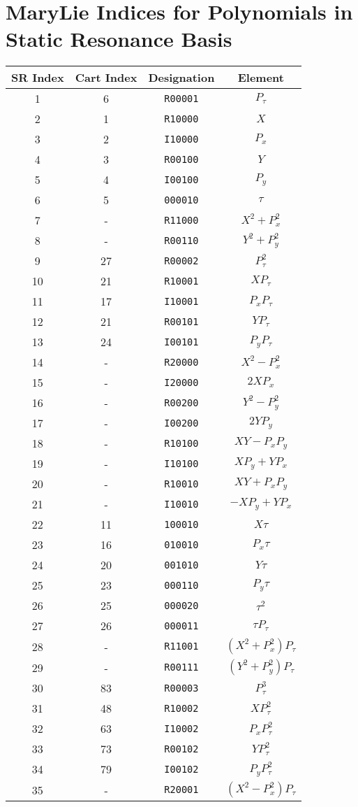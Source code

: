 {\clearpage
\section{MaryLie Indices for Polynomials in Static Resonance Basis}
{\rm
\begin{center}
\begin{tabular}{cccc}
SR Index&Cart Index&Designation&Element\\ \hline
    1&6&{\tt R00001}&$P_\tau$\\
    2&1&{\tt R10000}&$X$\\
    3&2&{\tt I10000}&$P_x$\\
    4&3&{\tt R00100}&$Y$\\
    5&4&{\tt I00100}&$P_y$\\
    6&5&{\tt 000010}&$\tau$\\
    7&-&{\tt R11000}&$X^2+P_x^2$\\
    8&-&{\tt R00110}&$Y^2+P_y^2$\\
    9&27&{\tt R00002}&$P_{\tau}^2$\\
   10&21&{\tt R10001}&$XP_{\tau}$\\
   11&17&{\tt I10001}&$P_xP_{\tau}$\\
   12&21&{\tt R00101}&$YP_{\tau}$\\
   13&24&{\tt I00101}&$P_yP_{\tau}$\\
   14&-&{\tt R20000}&$X^2-P_x^2$\\
   15&-&{\tt I20000}&$2XP_x$\\
   16&-&{\tt R00200}&$Y^2-P_y^2$\\
   17&-&{\tt I00200}&$2YP_y$\\
   18&-&{\tt R10100}&$XY-P_xP_y$\\
   19&-&{\tt I10100}&$XP_y+YP_x$\\
   20&-&{\tt R10010}&$XY+P_xP_y$\\
   21&-&{\tt I10010}&$-XP_y+YP_x$\\
   22&11&{\tt 100010}&$X{\tau}$\\
   23&16&{\tt 010010}&$P_x{\tau}$\\
   24&20&{\tt 001010}&$Y{\tau}$\\
   25&23&{\tt 000110}&$P_y{\tau}$\\
   26&25&{\tt 000020}&${\tau}^2$\\
   27&26&{\tt 000011}&${\tau}P_{\tau}$\\
   28&-&{\tt R11001}&$(X^2+P_x^2)P_{\tau}$\\
   29&-&{\tt R00111}&$(Y^2+P_y^2)P_{\tau}$\\
   30&83&{\tt R00003}&$P_{\tau}^3$\\
   31&48&{\tt R10002}&$XP_{\tau}^2$\\
   32&63&{\tt I10002}&$P_xP_{\tau}^2$\\
   33&73&{\tt R00102}&$YP_{\tau}^2$\\
   34&79&{\tt I00102}&$P_yP_{\tau}^2$\\
   35&-&{\tt R20001}&$(X^2-P_x^2)P_{\tau}$
\end{tabular}



\end{center}}}
